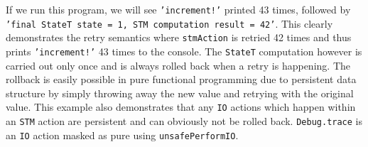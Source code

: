 If we run this program, we will see \texttt{'increment!'} printed 43 times, followed by \texttt{'final StateT state = 1, STM computation result = 42'}. This clearly demonstrates the retry semantics where \texttt{stmAction} is retried 42 times and thus prints \texttt{'increment!'} 43 times to the console. The \texttt{StateT} computation however is carried out only once and is always rolled back when a retry is happening. The rollback is easily possible in pure functional programming due to persistent data structure by simply throwing away the new value and retrying with the original value. This example also demonstrates that any \texttt{IO} actions which happen within an \texttt{STM} action are persistent and can obviously not be rolled back. \texttt{Debug.trace} is an \texttt{IO} action masked as pure using \texttt{unsafePerformIO}.